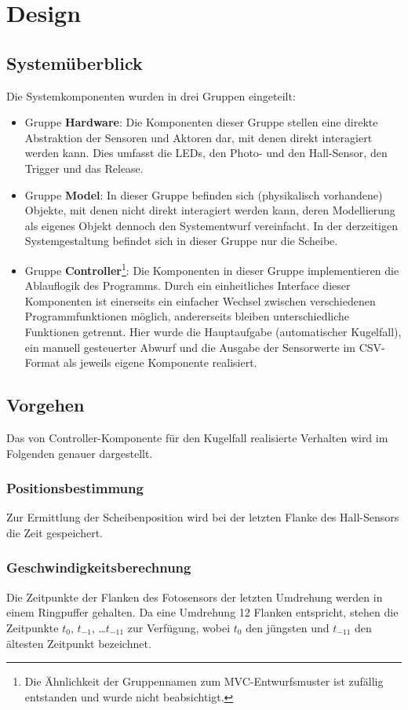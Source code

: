 \chapter{Design}\label{k_design}
\section{Systemüberblick}\label{design_systemueberlick}
Die Systemkomponenten wurden in drei Gruppen eingeteilt:
\begin{itemize}
	\item Gruppe \textbf{Hardware}: Die Komponenten dieser Gruppe stellen eine direkte Abstraktion der Sensoren und Aktoren dar, mit denen direkt interagiert werden kann.
	Dies umfasst die LEDs, den Photo- und den Hall-Sensor, den Trigger und das Release.
	\item Gruppe \textbf{Model}: In dieser Gruppe befinden sich (physikalisch vorhandene) Objekte, mit denen nicht direkt interagiert werden kann, deren Modellierung als eigenes Objekt dennoch den Systementwurf vereinfacht.
	In der derzeitigen Systemgestaltung befindet sich in dieser Gruppe nur die Scheibe.
	\item Gruppe \textbf{Controller}\footnote{Die Ähnlichkeit der Gruppennamen zum MVC-Entwurfsmuster ist zufällig entstanden und wurde nicht beabsichtigt.}:
	Die Komponenten in dieser Gruppe implementieren die Ablauflogik des Programms.
	Durch ein einheitliches Interface dieser Komponenten ist einerseits ein einfacher Wechsel zwischen verschiedenen Programmfunktionen möglich, andererseits bleiben unterschiedliche Funktionen getrennt.
	Hier wurde die Hauptaufgabe (automatischer Kugelfall), ein manuell gesteuerter Abwurf und die Ausgabe der Sensorwerte im CSV-Format als jeweils eigene Komponente realisiert.
\end{itemize}

\section{Vorgehen}
Das von Controller-Komponente für den Kugelfall realisierte Verhalten wird im Folgenden genauer dargestellt.

\subsection{Positionsbestimmung}\label{design_pos}
Zur Ermittlung der Scheibenposition wird bei der letzten Flanke des Hall-Sensors die Zeit gespeichert.

\subsection{Geschwindigkeitsberechnung}\label{design_geschwindigkeit}
Die Zeitpunkte der Flanken des Fotosensors der letzten Umdrehung werden in einem Ringpuffer gehalten.
Da eine Umdrehung 12 Flanken entspricht, stehen die Zeitpunkte $t_0$, $t_{-1}$, \dots $t_{-11}$ zur Verfügung, wobei $t_0$ den jüngsten und $t_{-11}$ den ältesten Zeitpunkt bezeichnet.

